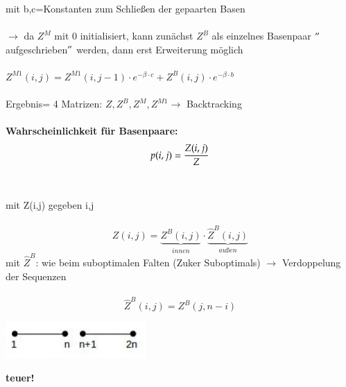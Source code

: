 mit b,c=Konstanten zum Schließen der gepaarten Basen
\\\\
$\rightarrow$ da $Z^M$ mit 0 initialisiert, kann zunächst $Z^B$ als einzelnes Basenpaar $"$aufgeschrieben$"$ werden, dann erst Erweiterung möglich
\\\\
$Z^{M1}(i,j)=Z^{M1}(i,j-1) \cdot e^{-\beta \cdot c} + Z^B(i,j) \cdot e^{-\beta \cdot b}$
\\\\
Ergebnis= 4 Matrizen: $Z, Z^B, Z^M, Z^{M1} \rightarrow$ Backtracking
\\\\
\textbf{Wahrscheinlichkeit für Basenpaare:}
\begin{equation}
p(i,j)={Z(i,j) \over Z}
\end{equation}
\\\\
mit Z(i,j) gegeben i,j
\\\\
\begin{equation}
Z(i,j)=\underbrace{Z^B(i,j)}_{innen} \cdot \underbrace{\widehat{Z}^B(i,j)}_{außen}
\end{equation}
mit $\widehat{Z}^B$: wie beim suboptimalen Falten (Zuker Suboptimals) $\rightarrow$ Verdoppelung der Sequenzen
\\\\
\begin{equation}
\widehat{Z}^B(i,j)= Z^B(j,n-i)
\end{equation}
\begin{center}
\includegraphics[width=0.4\textwidth]{lectures/160425/pix/1.jpg}
\end{center}
\textbf{teuer!}

\newpage

